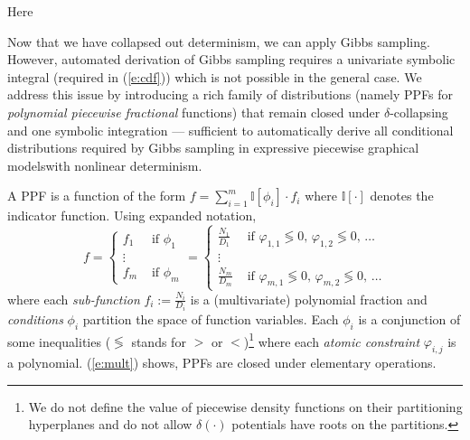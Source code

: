 \documentclass[letterpaper]{article}
\newcommand{\indicator}{\mathbb{I}}%
\newcommand{\case}[2]{#2 &\text{ if } #1}%
\begin{document}
Here  

Now that we have collapsed out determinism, we can apply Gibbs sampling. However, automated derivation of Gibbs sampling requires a univariate symbolic integral (required in (\ref{e:cdf})) which is not possible in the general case.
We address this issue by introducing a rich family of distributions (namely PPFs for \emph{polynomial piecewise fractional} functions) that remain closed under $\delta$-collapsing and one symbolic integration --- sufficient to automatically derive all conditional distributions required by Gibbs sampling in expressive piecewise graphical modelswith nonlinear determinism.  

A PPF is a function of the form
$f = \sum_{i=1}^m \indicator[\phi_i]\cdot f_i $ where $\indicator[\cdot]$ denotes the indicator function.
Using expanded notation, 
{\footnotesize
\begin{equation}
\label{e:ppf}
f =
  \begin{cases}
  \case{\phi_1}{f_1}\\
\vdots\\
  \case{\phi_m}{f_m}    
  \end{cases}
\!\!=
  \begin{cases}
  \case{\varphi_{1,1} \lessgtr 0,\, \varphi_{1,2} \lessgtr 0,\, \ldots}{\frac{N_1}{D_1}} \\
\vdots\\
   \case{\varphi_{m,1} \lessgtr 0,\, \varphi_{m,2} \lessgtr 0,\, \ldots}{\frac{N_m}{D_m}}    
  \end{cases}
\end{equation}
}
where each \emph{sub-function} $f_i := \frac{N_i}{D_i}$ is a (multivariate) polynomial fraction and
\emph{conditions} $\phi_i$ partition the space of function variables. 
Each $\phi_i$ is a conjunction of some inequalities ($\lessgtr$ stands for  
$>$ or $<$)\footnote{
We do not define the value of piecewise density functions on their partitioning hyperplanes and do not allow $\delta(\cdot)$ potentials have roots on the partitions. 
} 
where each \emph{atomic constraint} $\varphi_{i,j}$ is a polynomial.
(\ref{e:mult}) shows, PPFs are closed under elementary operations. 
\\
\end{document}
